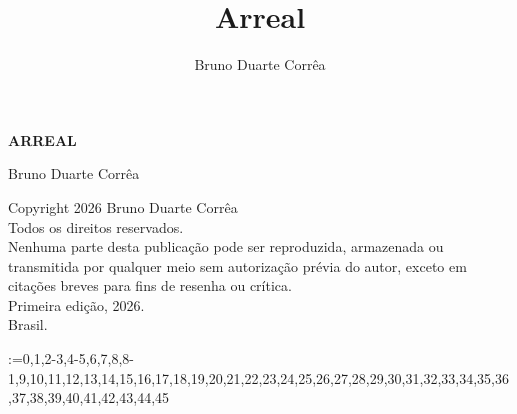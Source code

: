 \def\chapterslist{0,1,2-3,4-5,6,7,8,8-1,9,10,11,12,13,14,15,16,17,18,19,20,21,22,23,24,25,26,27,28,29,30,31,32,33,34,35,36,37,38,39,40,41,42,43,44,45}



\title{Arreal}
\author{Bruno Duarte Corrêa}



\frontmatter
\pagestyle{empty}

\thispagestyle{empty}
\begin{center}
  \vspace*{0.25\textheight}
  {\Huge\sffamily\bfseries\MakeUppercase{Arreal}\par}
  \vspace{2.2cm}
  {\Large Bruno Duarte Corrêa\par}
\end{center}
\vfill

\clearpage
\thispagestyle{empty}
\null\vfill
\begin{center}
\small
Copyright \textcopyright{} 2026 Bruno Duarte Corrêa\\[0.8em]
Todos os direitos reservados.\\[1.2em]
Nenhuma parte desta publicação pode ser reproduzida, armazenada ou transmitida
por qualquer meio sem autorização prévia do autor, exceto em citações breves
para fins de resenha ou crítica.\\[1.2em]
Primeira edição, 2026.\\
Brasil.
\end{center}
\vfill\null



\cleardoublepage
\mainmatter
\pagestyle{arreal}

\makeatletter
\@for\ch:=\chapterslist{}
\makeatother





